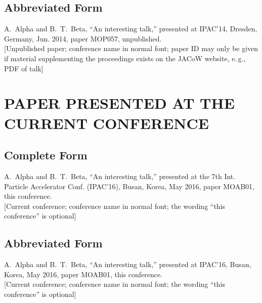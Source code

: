 \documentclass[letterpaper,  %
              ]{jacow-2_3}   %
\begin{document}
\subsection{Abbreviated Form}

\begin{thebibliography}{9} %
\setcounter{enumi}{3}
	A.~Alpha and B.~T.~Beta, 
	“An interesting talk,”
	presented at IPAC’14, 
	Dresden, Germany, Jun. 2014, paper MOP057, unpublished.\\
	\textcolor{jred}{[Unpublished paper; conference name in normal font; paper
	ID may only be given if material supplementing the proceedings
	exists on the JACoW website, e.\,g., PDF of talk]}
\end{thebibliography}


\section{PAPER PRESENTED AT THE CURRENT CONFERENCE}

\subsection{Complete Form}

\begin{thebibliography}{9} %
\setcounter{enumi}{4}
	A.~Alpha and B.~T.~Beta, 
	“An interesting talk,”
	presented at the 7th Int. Particle Accelerator Conf. (IPAC’16), 
	Busan, Korea, May 2016, 
	paper MOAB01, this conference.\\
	\textcolor{jgrepc}{[Current conference; conference name in normal font; the
			           wording “this conference” is optional]}
\end{thebibliography}

\subsection{Abbreviated Form}

\begin{thebibliography}{9} %
\setcounter{enumi}{4}
	A.~Alpha and B.~T.~Beta, 
	“An interesting talk,”
	presented at IPAC’16, 
	Busan, Korea, May 2016, 
	paper MOAB01, this conference.\\
	\textcolor{jgrepc}{[Current conference; conference name in normal font; the
		wording “this conference” is optional]}
\end{thebibliography}
\end{document}
